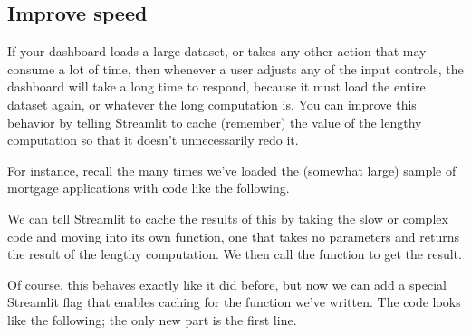 \documentclass[letterpaper,10pt,english]{jupyterBook}
\begin{document}
\sphinxAtStartPar
{}


\subsection{Improve speed}
\label{\detokenize{chapter-14-dashboards:improve-speed}}
\sphinxAtStartPar
If your dashboard loads a large dataset, or takes any other action that may consume a lot of time, then whenever a user adjusts any of the input controls, the dashboard will take a long time to respond, because it must load the entire dataset again, or whatever the long computation is.  You can improve this behavior by telling Streamlit to cache (remember) the value of the lengthy computation so that it doesn’t unnecessarily redo it.

\sphinxAtStartPar
For instance, recall the many times we’ve loaded the (somewhat large) sample of mortgage applications with code like the following.

\begin{sphinxVerbatim}[commandchars=\\\{\}]
    
\end{sphinxVerbatim}

\sphinxAtStartPar
We can tell Streamlit to cache the results of this by taking the slow or complex code and moving into its own function, one that takes no parameters and returns the result of the lengthy computation.  We then call the function to get the result.

\begin{sphinxVerbatim}[commandchars=\\\{\}]
  
       

  
\end{sphinxVerbatim}

\sphinxAtStartPar
Of course, this behaves exactly like it did before, but now we can add a special Streamlit flag that enables caching for the function we’ve written.  The code looks like the following; the only new part is the first line.
\end{document}
